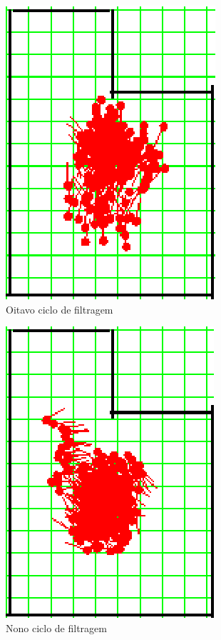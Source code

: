 \begin{figure}[H]
  \centering
  \includegraphics[scale=1]{figuras/cen1_ex3/9.eps}
  \caption[Oitavo Ciclo de Filtragem]{Oitavo ciclo de filtragem}
  \label{img:cen1_ex3_9}
\end{figure}

\begin{figure}[H]
  \centering
  \includegraphics[scale=1]{figuras/cen1_ex3/10.eps}
  \caption[Nono Ciclo de Filtragem]{Nono ciclo de filtragem}
  \label{img:cen1_ex3_10}
\end{figure}

